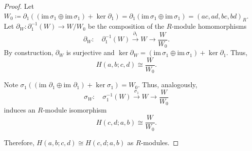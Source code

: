 \documentclass[10pt,a4paper]{amsart}
\begin{document}
\begin{proof}
	Let $W_{0}\coloneqq\partial_{1}\left(\left(\text{im}\,\sigma_{1}\oplus\text{im}\,\sigma_{1}\right)+\ker\partial_{1}\right)=\partial_{1}\left(\text{im}\,\sigma_{1}\oplus\text{im}\,\sigma_{1}\right)=\left(ac,ad,bc,bd\right)_{R}$.
	Let $\partial_{W}:\partial_{1}^{-1}\left(W\right)\rightarrow W/W_{0}$
	be the composition of the $R$-module homomorphisms
	\begin{equation}
		\partial_{W}:\quad\partial_{1}^{-1}\left(W\right)\xrightarrow{\partial_{1}}W\rightarrow\frac{W}{W_{0}}.
	\end{equation}
	By construction, $\partial_{W}$ is surjective and $\ker\partial_{W}=\left(\text{im}\,\sigma_{1}\oplus\text{im}\,\sigma_{1}\right)+\ker\partial_{1}$.
	Thus, 
	\begin{equation}
		H\left(a,b;c,d\right)\cong\frac{W}{W_{0}}.
	\end{equation}
	
	Note $\sigma_{1}\left(\left(\text{im }\partial_{1}\oplus\text{im }\partial_{1}\right)+\ker\sigma_{1}\right)=W_{0}$.
	Thus, analogously, 
	\begin{equation}
		\sigma_{W}:\quad\sigma_{1}^{-1}\left(W\right)\xrightarrow{\sigma_{1}}W\rightarrow\frac{W}{W_{0}}
	\end{equation}
	induces an $R$-module isomorphism
	\begin{equation}
		H\left(c,d;a,b\right)\cong\frac{W}{W_{0}}. 
	\end{equation}
	
	Therefore, $H\left(a,b;c,d\right)\cong H\left(c,d;a,b\right)$ as
	$R$-modules. 
\end{proof}
\end{document}
